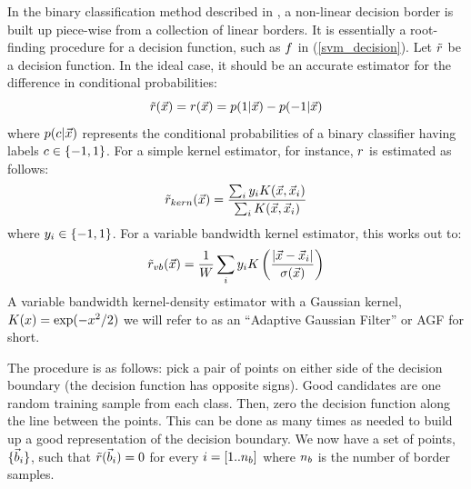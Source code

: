 \documentclass[11pt]{article}
\begin{document}
In the binary classification method described in \citet{Mills2011},
a non-linear decision border is built up piece-wise from a collection of linear borders.
It is essentially a root-finding procedure for a decision function,
such as $f$ in (\ref{svm_decision}).
Let $\tilde r$ be a decision function. In the ideal case, it should
be an accurate estimator for the difference in conditional probabilities:
\begin{equation}
	\tilde r(\vec {x}) = r(\vec {x}) = 
	p(1|\vec {x}) - p(-1|\vec {x})
\end{equation}
where $p(c|\vec {x})$ represents the conditional probabilities of
a binary classifier having labels $c \in \lbrace -1, 1 \rbrace$.
For a simple kernel estimator, for instance, 
$r$ is estimated as follows:
\begin{equation}
	\tilde r_{kern}(\vec {x}) = \frac{\sum_i y_i K(\vec {x}, \vec {x}_i)}{\sum_i K(\vec {x}, \vec {x}_i)}
	\label{kernel_decision}
\end{equation}
where $y_i \in \lbrace -1, 1 \rbrace$.
For a variable bandwidth kernel estimator, this works out to:
\begin{equation}
	\tilde r_{vb}(\vec {x}) = \frac{1}{W} \sum_i y_i K \left (\frac{|\vec {x} - \vec {x}_i|}{\sigma(\vec {x})} \right )
	\label{vb_kernel_r}
\end{equation}
A variable bandwidth kernel-density estimator with a Gaussian kernel,
$K(x)=\exp(-x^2/2)$ we will refer to as an ``Adaptive Gaussian
Filter'' or AGF for short.

The procedure is as follows: pick a pair of points on either side of the decision
boundary (the decision function has opposite signs). Good candidates are one
random training sample from each class. Then, zero the decision function
along the line between the points. This can be done as many times as needed
to build up a good representation of the decision boundary.
We now have a set of points, $\lbrace \vec b_i \rbrace$, such that
$\tilde r(\vec b_i)=0$ for every $i=[1..n_b]$ where
$n_b$ is the number of border samples.
\end{document}
